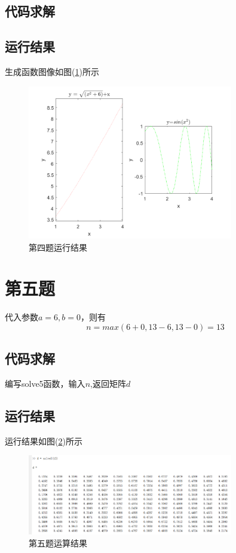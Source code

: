 \documentclass[a4paper,left=2.5cm,right=2.5cm]{article}
\begin{document}
\begin{spacing}{1.6}
	\subsection{代码求解}
	
	\subsection{运行结果}
	生成函数图像如图(\ref{sol4})所示
	\begin{figure}[H]
		\includegraphics[width=0.8\textwidth]{image/result_4.png}
		\caption{第四题运行结果}
		\label{sol4}
	\end{figure}
	\section{第五题}
	代入参数$a=6,b=0$，则有
	\begin{equation}
	n = max(6+0,13-6,13-0) = 13
	\end{equation}
	\subsection{代码求解}
	编写solve5函数，输入$n$,返回矩阵$d$
	
	\subsection{运行结果}
	运行结果如图(\ref{sol5})所示
	\begin{figure}[H]
		\includegraphics[width=0.8\textwidth]{image/result_5.png}
		\caption{第五题运算结果}
		\label{sol5}
	\end{figure}
	\end{spacing}
\end{document}
